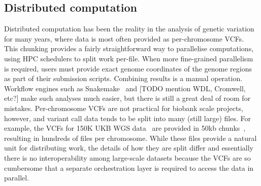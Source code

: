 \documentclass[a4paper,num-refs]{oup-contemporary}
\begin{document}


\subsection{Distributed computation}
Distributed computation has been the reality in the analysis
of genetic variation for many years,
where data is most often provided as per-chromosome VCFs.
This chunking provides a fairly straightforward way to parallelise
computations, using HPC schedulers to split work per-file.
When more fine-grained parallelism is required, users must
provide exact genome coordinates of the genome regions
as part of their submission scripts. Combining results
is a manual operation.
Workflow engines such as
Snakemake~\cite{koster2012snakemake,molder2021sustainable}
and [TODO mention WDL, Cromwell, etc?] make such analyses
much easier, but there is still a great deal of room for
mistakes.
Per-chromosome VCFs are not practical for biobank scale
projects, however, and variant call data tends to be split
into many (still large) files.
For example, the VCFs for 150K UKB WGS data~\cite{halldorsson2022sequences}
are provided in 50kb chunks~\cite{browning2023statistical}, resulting in
hundreds of files per chromosome.
While these files provide a natural
unit for distributing work, the details of how they
are split differ and essentially there is
no interoperability among large-scale datasets because the VCFs are
so cumbersome that a separate orchestration layer is required to
access the data in parallel.
\end{document}
